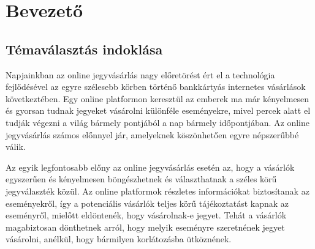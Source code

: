 \chapter{Bevezető}%


\section {Témaválasztás indoklása}

Napjainkban az online jegyvásárlás nagy előretörést ért el a technológia fejlődésével az egyre szélesebb körben történő bankkártyás internetes vásárlások következtében. Egy online platformon keresztül az emberek ma már kényelmesen és gyorsan tudnak jegyeket vásárolni különféle eseményekre, mivel percek alatt el tudják végezni a világ bármely pontjából a nap bármely időpontjában. Az online jegyvásárlás számos előnnyel jár, amelyeknek köszönhetően egyre népszerűbbé válik.

Az egyik legfontosabb előny az online jegyvásárlás esetén az, hogy a vásárlók egyszerűen és kényelmesen böngészhetnek és választhatnak a széles körű jegyválaszték közül. Az online platformok részletes információkat biztosítanak az eseményekről, így a potenciális vásárlók teljes körű tájékoztatást kapnak az eseményről, mielőtt eldöntenék, hogy vásárolnak-e jegyet. Tehát a vásárlók magabiztosan dönthetnek arról, hogy melyik eseményre szeretnének jegyet vásárolni, anélkül, hogy bármilyen korlátozásba ütköznének.

